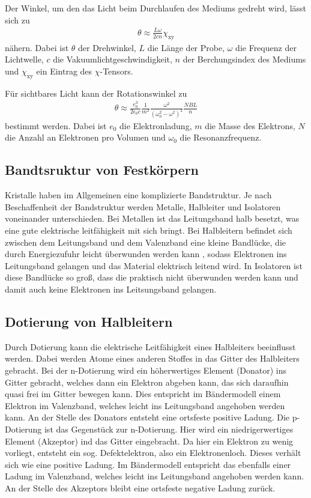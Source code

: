 Der Winkel, um den das Licht beim Durchlaufen des Mediums gedreht wird, lässt sich zu
\begin{align}
  \theta \approx \frac{L \omega}{2 c n}\chi_{\mathrm{xy}}
  \label{eqn:theta1}
\end{align}
nähern. Dabei ist $\theta$ der Drehwinkel, $L$ die Länge der Probe, $\omega$ die Frequenz
der Lichtwelle, $c$ die Vakuumlichtgeschwindigkeit, $n$ der Berchungsindex des Mediums
und $\chi_{\mathrm{xy}}$ ein Eintrag des $\chi$-Tensors.

Für sichtbares Licht kann der Rotationswinkel zu
\begin{align}
  \theta \approx \frac{e^3_0}{2 \epsilon_0 c} \frac{1}{m^2}\frac{\omega^2}{(\omega^2_0 - \omega^2)^2} \frac{NBL}{n}
  \label{eqn:theta2}
\end{align}
bestimmt werden. Dabei ist $e_0$ die Elektronladung, $m$ die Masse des Elektrons, $N$
die Anzahl an Elektronen pro Volumen und $\omega_0$ die Resonanzfrequenz.


\subsection{Bandtsruktur von Festkörpern}
\label{subsec:bandstruktur}

Kristalle haben im Allgemeinen eine komplizierte Bandstruktur. Je nach Beschaffenheit
der Bandstruktur werden Metalle, Halbleiter und Isolatoren voneinander unterschieden.
Bei Metallen ist das Leitungsband halb besetzt, was eine gute elektrische leitfähigkeit
mit sich bringt. Bei Halbleitern befindet sich zwischen dem Leitungsband und dem
Valenzband eine kleine Bandlücke, die durch Energiezufuhr leicht überwunden
werden kann \cite{Gefährliche Formulierung}, sodass Elektronen ins Leitungsband gelangen und das Material elektrisch
leitend wird. In Isolatoren ist diese Bandlücke so groß, dass die praktisch nicht
überwunden werden kann und damit auch keine Elektronen ins Leitsungsband gelangen.

\cite{Könnten hier Bilder helfen?}


\subsection{Dotierung von Halbleitern}
\label{subsec:dotierung}
Durch Dotierung kann die elektrische Leitfähigkeit eines Halbleiters beeinflusst werden.
Dabei werden Atome eines anderen Stoffes in das Gitter des Halbleiters gebracht.
Bei der n-Dotierung wird ein höherwertiges Element (Donator) ins Gitter gebracht, welches
dann ein Elektron abgeben kann, das sich daraufhin quasi frei im Gitter bewegen kann.
Dies entspricht im Bändermodell einem Elektron im Valenzband, welches leicht
ins Leitungsband angehoben werden kann. An der Stelle
des Donators entsteht eine ortsfeste positive Ladung.
Die p-Dotierung ist das Gegenstück zur n-Dotierung. Hier wird ein niedrigerwertiges
Element (Akzeptor) ind das Gitter eingebracht. Da hier ein Elektron zu wenig vorliegt,
entsteht ein sog. Defektelektron, also ein Elektronenloch. Dieses verhält sich
wie eine positive Ladung. Im Bändermodell entspricht das ebenfalls einer Ladung
im Valenzband, welches leicht ins Leitungsband angehoben werden kann. An der Stelle
des Akzeptors bleibt eine ortsfeste negative Ladung zurück.

